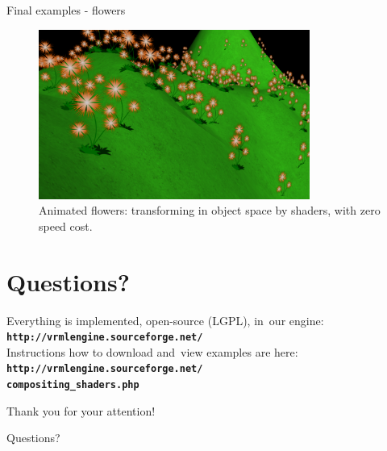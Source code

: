 \documentclass{beamer}
\begin{document}

\begin{frame}{Final examples - flowers}
\begin{figure}
  \centering
  \includegraphics[width=3.5in]{../flowers}
  \caption{Animated flowers: transforming in object space by shaders, with zero speed cost.}
\end{figure}
\end{frame}

\section{Questions?}

\begin{frame}[t]

\begin{center}
{\small
Everything is implemented, open-source (LGPL), in~our engine:\\
{\color{blue} \textbf{\texttt{http://vrmlengine.sourceforge.net/}}}\\
Instructions how to download and~view examples are here:\\
{\color{blue} \textbf{\texttt{http://vrmlengine.sourceforge.net/\\
compositing\_shaders.php}}}}
\end{center}

\vspace{0.25in}

\begin{center}
{\Large Thank you for your attention!}
\end{center}


\begin{center}
{\Huge \alert{Questions?}}
\end{center}

\end{frame}
\end{document}
